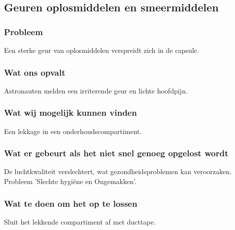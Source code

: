 \subsection{Geuren oplosmiddelen en smeermiddelen}

\subsubsection{Probleem}
Een sterke geur van oplosmiddelen verspreidt zich in de capsule.

\subsubsection{Wat ons opvalt}
Astronauten melden een irriterende geur en lichte hoofdpijn.

\subsubsection{Wat wij mogelijk kunnen vinden}
Een lekkage in een onderhoudscompartiment.

\subsubsection{Wat er gebeurt als het niet snel genoeg opgelost wordt}
De luchtkwaliteit verslechtert, wat gezondheidsproblemen kan veroorzaken. Probleem 'Slechte hygiëne en Ongemakken'.

\subsubsection{Wat te doen om het op te lossen}
Sluit het lekkende compartiment af met ducttape.